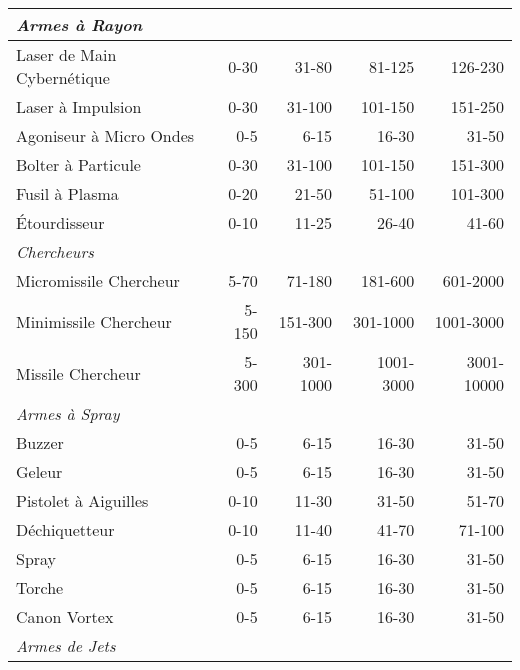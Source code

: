 \begin{table}
\begin{tabularx}{\textwidth}{|X|r|r|r|r|}
\multicolumn{5}{|l|}{\emph{Armes à Rayon}} \\ \hline

Laser de Main Cybernétique	&0-30	&31-80	&81-125	&126-230 \\ \hline

Laser à Impulsion	&0-30	&31-100	&101-150	&151-250 \\ \hline

Agoniseur à Micro Ondes	&0-5	&6-15	&16-30	&31-50 \\ \hline

Bolter à Particule	&0-30	&31-100	&101-150	&151-300 \\ \hline

Fusil à Plasma	&0-20	&21-50	&51-100	&101-300 \\ \hline

Étourdisseur	&0-10	&11-25	&26-40	&41-60 \\ \hline

\multicolumn{5}{|l|}{\emph{Chercheurs}} \\ \hline

Micromissile Chercheur	&5-70	&71-180	&181-600	&601-2000 \\ \hline

Minimissile Chercheur	&5-150	&151-300	&301-1000	&1001-3000 \\ \hline

Missile Chercheur	&5-300	&301-1000	&1001-3000	&3001-10000 \\ \hline

\multicolumn{5}{|l|}{\emph{Armes à Spray}} \\ \hline

Buzzer	&0-5	&6-15	&16-30	&31-50\\ \hline

Geleur	&0-5	&6-15	&16-30	&31-50\\ \hline

Pistolet à Aiguilles	&0-10	&11-30	&31-50	&51-70\\ \hline

Déchiquetteur	&0-10	&11-40	&41-70	&71-100\\ \hline

Spray	&0-5	&6-15	&16-30	&31-50\\ \hline

Torche	&0-5	&6-15	&16-30	&31-50\\ \hline

Canon Vortex	&0-5	&6-15	&16-30	&31-50\\ \hline

\multicolumn{5}{|l|}{\emph{Armes de Jets}} \\ \hline


\end{tabularx}
\end{table}
